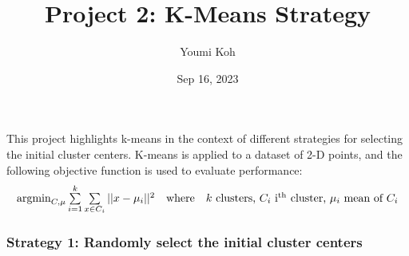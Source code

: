 \documentclass[twocolumn]{article}
\title{Project 2: K-Means Strategy}
\author{Youmi Koh}
\date{Sep 16, 2023}
\begin{document}
\maketitle
\noindent

This project highlights k-means in the context of different strategies for selecting the initial cluster centers. K-means is applied to a dataset of 2-D points, and the following objective function is used to evaluate performance:
\[
    \begin{array}{lll}
        \operatorname{argmin}_{C,\mu} \sum\limits_{i=1}^{k}\sum\limits_{x\in C_i}||x-\mu_i||^2 & \text{where} & \textstyle k\ \text{clusters, } C_i\ \text{i\textsuperscript{th}} \text{ cluster, } \mu_i\ \text{mean of } C_i
    \end{array}
\]

\subsubsection*{Strategy 1: Randomly select the initial cluster centers}
\end{document}
